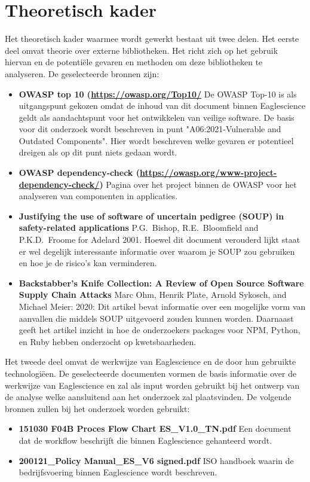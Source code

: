 \section{Theoretisch kader}\label{sec:theoretisch-kader}
Het theoretisch kader waarmee wordt gewerkt bestaat uit twee delen. Het eerste deel omvat theorie over externe bibliotheken. Het richt zich op het gebruik hiervan en de potentiële gevaren en methoden om deze bibliotheken te analyseren. De geselecteerde bronnen zijn:
\begin{itemize}
    \item \textbf{OWASP top 10 (\url{https://owasp.org/Top10/}}
    De OWASP Top-10 is als uitgangspunt gekozen omdat de inhoud van dit document binnen Eaglescience geldt als aandachtspunt voor het ontwikkelen van veilige software. De basis voor dit onderzoek wordt beschreven in punt "A06:2021-Vulnerable and Outdated Components". Hier wordt beschreven welke gevaren er potentieel dreigen als op dit punt niets gedaan wordt.
    \item \textbf{OWASP dependency-check (\url{https://owasp.org/www-project-dependency-check/})} Pagina over het project binnen de OWASP voor het analyseren van componenten in applicaties.
    \item \textbf{Justifying the use of software of uncertain pedigree (SOUP) in safety-related applications} P.G.\ Bishop, R.E.\ Bloomfield and P.K.D.\  Froome for Adelard 2001. Hoewel dit document verouderd lijkt staat er wel degelijk interessante informatie over waarom je SOUP zou gebruiken en hoe je de risico's kan verminderen.
    \item \textbf{Backstabber’s Knife Collection: A Review of Open Source Software Supply Chain Attacks} Marc Ohm, Henrik Plate, Arnold Sykosch, and Michael Meier: 2020: Dit artikel bevat informatie over een mogelijke vorm van aanvallen die middels SOUP uitgevoerd zouden kunnen worden. Daarnaast geeft het artikel inzicht in hoe de onderzoekers packages voor NPM, Python, en Ruby hebben onderzocht op kwetsbaarheden.
\end{itemize}
Het tweede deel omvat de werkwijze van Eaglescience en de door hun gebruikte technologiëen. De geselecteerde documenten vormen de basis informatie over de werkwijze van Eaglescience en zal als input worden gebruikt bij het ontwerp van de analyse welke aansluitend aan het onderzoek zal plaatsvinden. De volgende bronnen zullen bij het onderzoek worden gebruikt:
\begin{itemize}
    \item \textbf{151030 F04B Proces Flow Chart ES\_V1.0\_TN.pdf} Een document dat de workflow beschrijft die binnen Eaglescience gehanteerd wordt.
    \item \textbf{200121\_Policy Manual\_ES\_V6 signed.pdf} ISO handboek waarin de bedrijfsvoering binnen Eaglescience wordt beschreven.
\end{itemize}

